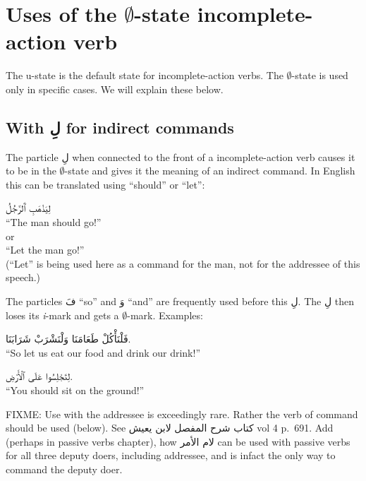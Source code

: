 \documentclass[
  10pt,
]{book}
\begin{document}
\section{\texorpdfstring{Uses of the \(\emptyset\)-state incomplete-action verb}{Uses of the \textbackslash emptyset-state incomplete-action verb}}\label{uses-of-the-emptyset-state-incomplete-action-verb}

The u-state is the default state for incomplete-action verbs. The
\(\emptyset\)-state
is used only in specific cases. We will explain these below.

\subsection{\texorpdfstring{With \foreignlanguage{arabic}{لِ} for indirect commands}{With لِ for indirect commands}}\label{with-ux644-for-indirect-commands}

The particle \foreignlanguage{arabic}{لِ} when connected to the front of a
incomplete-action verb
causes it to be in the
\(\emptyset\)-state
and gives it the meaning of an indirect command. In English this can be translated using \enquote{should} or \enquote{let}:

\foreignlanguage{arabic}{لِيَذْهَبِ ٱَلرَّجُلُ}\\
\enquote{The man should go!}\\
or\\
\enquote{Let the man go!}\\
(\enquote{Let} is being used here as a command for the man, not for the addressee of this speech.)

The particles \foreignlanguage{arabic}{فَ} \enquote{so} and \foreignlanguage{arabic}{وَ} \enquote{and} are frequently used before this \foreignlanguage{arabic}{لِ}.
The \foreignlanguage{arabic}{لِ} then loses its \emph{i}-mark and gets a
\(\emptyset\)-mark. Examples:

\foreignlanguage{arabic}{فَلْنَأْکُلْ طَعَامَنَا وَلْنَشْرَبْ شَرَابَنَا.}\\
\enquote{So let us eat our food and drink our drink!}

\foreignlanguage{arabic}{لِتَجْلِسُوا عَلَى ٱلْأَرْضِ.}\\
\enquote{You should sit on the ground!}

FIXME: Use with the addressee is exceedingly rare. Rather the verb of command should be used (below). See \foreignlanguage{arabic}{کتاب شرح المفصل لابن يعيش} vol 4 p.~691. Add (perhaps in passive verbs chapter), how \foreignlanguage{arabic}{لام الأمر} can be used with passive verbs for all three deputy doers, including addressee, and is infact the only way to command the deputy doer.
\end{document}
